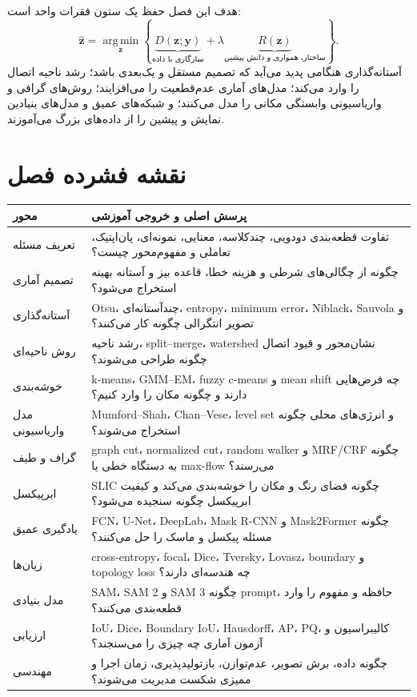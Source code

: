 \documentclass[12pt,openany,oneside]{book}
\newcommand{\vect}[1]{\bm{#1}}
\newcommand{\argmin}{\operatorname*{arg\,min}}
\begin{document}
\begin{goalbox}
هدف این فصل حفظ یک ستون فقرات واحد است:
\[
\widehat{\vect z}=\argmin_{\vect z}\left\{
\underbrace{D(\vect z;\vect y)}_{\text{سازگاری با داده}}
+\lambda\underbrace{R(\vect z)}_{\text{ساختار، همواری و دانش پیشین}}
\right\}.
\]
آستانه‌گذاری هنگامی پدید می‌آید که تصمیم مستقل و یک‌بعدی باشد؛ رشد ناحیه اتصال را وارد می‌کند؛ مدل‌های آماری
عدم‌قطعیت را می‌افزایند؛ روش‌های گرافی و واریاسیونی وابستگی مکانی را مدل می‌کنند؛ و شبکه‌های عمیق و مدل‌های
بنیادین نمایش و پیشین را از داده‌های بزرگ می‌آموزند.
\end{goalbox}

\chapter*{نقشه فشرده فصل}
\begin{longtable}{p{34mm}p{105mm}}
\toprule
محور & پرسش اصلی و خروجی آموزشی \\
\midrule
تعریف مسئله & تفاوت قطعه‌بندی دودویی، چندکلاسه، معنایی، نمونه‌ای، پان‌اپتیک، تعاملی و مفهوم‌محور چیست؟ \\
تصمیم آماری & چگونه از چگالی‌های شرطی و هزینه خطا، قاعده بیز و آستانه بهینه استخراج می‌شود؟ \\
آستانه‌گذاری & Otsu، چندآستانه‌ای، entropy، minimum error، Niblack، Sauvola و تصویر انتگرالی چگونه کار می‌کنند؟ \\
روش ناحیه‌ای & رشد ناحیه، split--merge، watershed نشان‌محور و قیود اتصال چگونه طراحی می‌شوند؟ \\
خوشه‌بندی & k-means، GMM--EM، fuzzy c-means و mean shift چه فرض‌هایی دارند و چگونه مکان را وارد کنیم؟ \\
مدل واریاسیونی & Mumford--Shah، Chan--Vese، level set و انرژی‌های محلی چگونه استخراج می‌شوند؟ \\
گراف و طیف & graph cut، normalized cut، random walker و MRF/CRF چگونه به دستگاه خطی یا max-flow می‌رسند؟ \\
ابرپیکسل & SLIC چگونه فضای رنگ و مکان را خوشه‌بندی می‌کند و کیفیت ابرپیکسل چگونه سنجیده می‌شود؟ \\
یادگیری عمیق & FCN، U-Net، DeepLab، Mask R-CNN و Mask2Former چگونه مسئله پیکسل و ماسک را حل می‌کنند؟ \\
زیان‌ها & cross-entropy، focal، Dice، Tversky، Lovasz، boundary و topology loss چه هندسه‌ای دارند؟ \\
مدل بنیادی & SAM، SAM 2 و SAM 3 چگونه prompt، حافظه و مفهوم را وارد قطعه‌بندی می‌کنند؟ \\
ارزیابی & IoU، Dice، Boundary IoU، Hausdorff، AP، PQ، کالیبراسیون و آزمون آماری چه چیزی را می‌سنجند؟ \\
مهندسی & چگونه داده، برش تصویر، عدم‌توازن، بازتولیدپذیری، زمان اجرا و ممیزی شکست مدیریت می‌شوند؟ \\
\bottomrule
\end{longtable}
\end{document}
